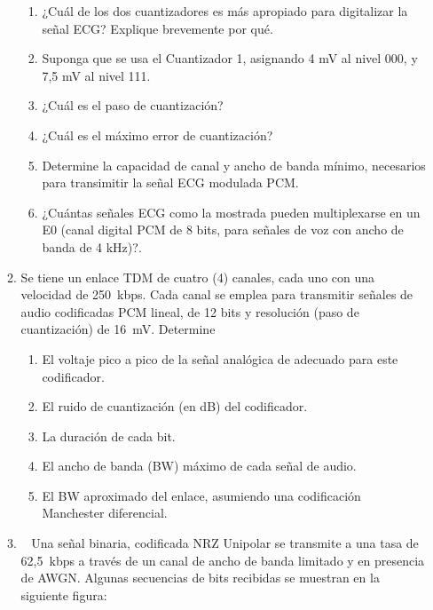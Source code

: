 \begin{enumerate}
\begin{enumerate}
	
	\begin{enumerate}
		\item ¿Cuál de los dos cuantizadores es más apropiado para digitalizar la señal ECG? Explique brevemente por qué.
		
		\item Suponga que se usa el Cuantizador 1, asignando 4 mV al nivel 000, y 7,5 mV al nivel 111. 
		\item ¿Cuál es el paso de cuantización? 
		\item ¿Cuál es el máximo error de cuantización? 
		\item Determine la capacidad de canal y ancho de banda mí­nimo, necesarios para transimitir la señal ECG modulada PCM.
		\item ¿Cuántas señales ECG como la mostrada pueden multiplexarse en un E0 (canal digital PCM de 8 bits, para señales de voz con ancho de banda de 4 kHz)?.
		
	\end{enumerate}
	\item Se tiene un enlace TDM de cuatro (4) canales, cada uno con una velocidad de 250~kbps.
	Cada canal se emplea para transmitir señales de audio codificadas PCM lineal, de 12 bits y resolución (paso de cuantización) de 16~mV. Determine
	\begin{enumerate}
		\item El voltaje pico a pico de la señal analógica de adecuado para este codificador.
		
		\item El ruido de cuantización (en dB) del codificador.
		
		\item La duración de cada bit.
		
		\item El ancho de banda (BW) máximo de cada señal de audio. 
		
		\item El BW aproximado del enlace, asumiendo una codificación Manchester diferencial.
		
	\end{enumerate}
\item~ Una señal binaria, codificada NRZ Unipolar se transmite a una tasa de 62,5~kbps a través de un canal de ancho de banda limitado y en presencia de AWGN. Algunas secuencias de bits recibidas se muestran en la siguiente figura:



\end{enumerate}
\end{enumerate}
